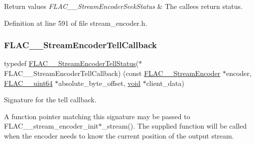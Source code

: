 \begin{DoxyRetVals}{Return values}
{\em F\+L\+A\+C\+\_\+\+\_\+\+Stream\+Encoder\+Seek\+Status} & The callee\textquotesingle{}s return status. \\
\hline
\end{DoxyRetVals}


Definition at line 591 of file stream\+\_\+encoder.\+h.

\mbox{\label{group__flac__stream__encoder_gabefdf2279e1d0347d9f98f46da4e415b}} 
\subsubsection{\texorpdfstring{FLAC\_\_StreamEncoderTellCallback}{FLAC\_\_StreamEncoderTellCallback}}
{\footnotesize\ttfamily typedef \mbox{\hyperlink{group__flac__stream__encoder_gab628f63181250eb977a28bf12b7dd9ff}{F\+L\+A\+C\+\_\+\+\_\+\+Stream\+Encoder\+Tell\+Status}}($\ast$ F\+L\+A\+C\+\_\+\+\_\+\+Stream\+Encoder\+Tell\+Callback) (const \mbox{\hyperlink{struct_f_l_a_c_____stream_encoder}{F\+L\+A\+C\+\_\+\+\_\+\+Stream\+Encoder}} $\ast$encoder, \mbox{\hyperlink{ordinals_8h_aa78c8c70a3eb8a58af7436f278acde8e}{F\+L\+A\+C\+\_\+\+\_\+uint64}} $\ast$absolute\+\_\+byte\+\_\+offset, \mbox{\hyperlink{_s_d_l__opengles2__gl2ext_8h_ae5d8fa23ad07c48bb609509eae494c95}{void}} $\ast$client\+\_\+data)}

Signature for the tell callback.

A function pointer matching this signature may be passed to F\+L\+A\+C\+\_\+\+\_\+stream\+\_\+encoder\+\_\+init$\ast$\+\_\+stream(). The supplied function will be called when the encoder needs to know the current position of the output stream.

